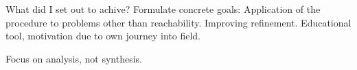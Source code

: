 What did I set out to achive?
Formulate concrete goals:
Application of the procedure to problems other than reachability.
Improving refinement.
Educational tool, motivation due to own journey into field.

Focus on analysis, not synthesis.

